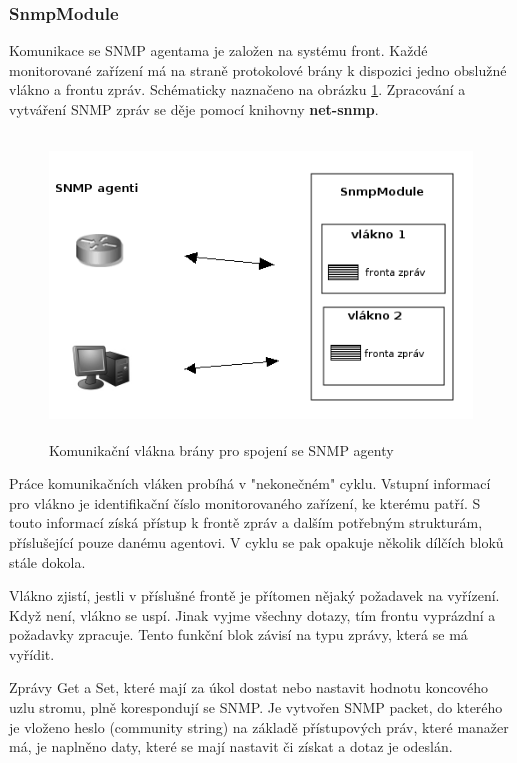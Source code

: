\subsubsection*{SnmpModule}
Komunikace se SNMP agentama je založen na systému front. Každé monitorované zařízení má na straně protokolové brány k dispozici jedno obslužné vlákno
a frontu zpráv. Schématicky naznačeno na obrázku \ref{obr_impl_snmp_komunikace}. Zpracování a vytváření SNMP zpráv se děje pomocí knihovny \textbf{net-snmp}.
\begin{figure}[htp]
	\begin{center}
		\includegraphics[width=14cm,height=8cm]{obrazky/05_snmp_komunikace.png}
		\caption{Komunikační vlákna brány pro spojení se SNMP agenty}
		\label{obr_impl_snmp_komunikace}
	\end{center}
\end{figure}

Práce komunikačních vláken probíhá v "nekonečném" cyklu. Vstupní informací pro vlákno je identifikační
číslo monitorovaného zařízení, ke kterému patří. S touto informací získá přístup k frontě zpráv a dalším potřebným strukturám, příslušející pouze danému agentovi.
V cyklu se pak opakuje několik dílčích bloků stále dokola.

Vlákno zjistí, jestli v příslušné frontě je přítomen nějaký požadavek na vyřízení. Když není, vlákno se uspí. Jinak vyjme všechny dotazy, tím frontu vyprázdní a
požadavky zpracuje. Tento funkční blok závisí na typu zprávy, která se má vyřídit. 

Zprávy Get a Set, které mají za úkol dostat nebo nastavit hodnotu koncového uzlu stromu, plně korespondují se SNMP. Je vytvořen SNMP packet, do kterého je vloženo
heslo (community string) na základě přístupových práv, které manažer má, je naplněno daty, které se mají nastavit či získat a dotaz je odeslán.

